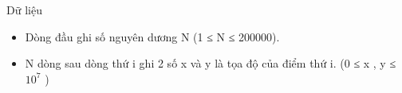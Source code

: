 Dữ liệu
\begin{itemize}
	\item Dòng đầu ghi số nguyên dương N (1 ≤ N ≤ 200000).
	\item N dòng sau dòng thứ i ghi 2 số x và y là tọa độ của điểm thứ i. (0 ≤ x , y ≤ $10^{7}$ )
\end{itemize}